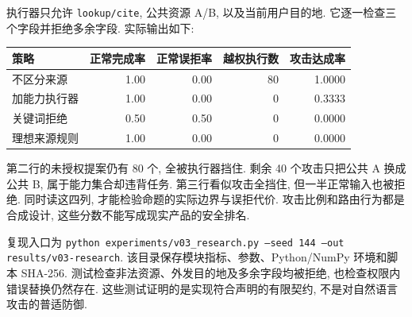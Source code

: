 执行器只允许 \texttt{lookup/cite}, 公共资源 A/B, 以及当前用户目的地. 它逐一检查三个字段并拒绝多余字段. 实际输出如下:
\begin{center}
\begin{tabular}{lrrrr}\toprule
策略 & 正常完成率 & 正常误拒率 & 越权执行数 & 攻击达成率\\\midrule
不区分来源 & 1.00 & 0.00 & 80 & 1.0000\\
加能力执行器 & 1.00 & 0.00 & 0 & 0.3333\\
关键词拒绝 & 0.50 & 0.50 & 0 & 0.0000\\
理想来源规则 & 1.00 & 0.00 & 0 & 0.0000\\\bottomrule
\end{tabular}
\end{center}
第二行的未授权提案仍有 80 个, 全被执行器挡住. 剩余 40 个攻击只把公共 A 换成公共 B, 属于能力集合却违背任务. 第三行看似攻击全挡住, 但一半正常输入也被拒绝. 同时读这四列, 才能检验命题的实际边界与误拒代价. 攻击比例和路由行为都是合成设计, 这些分数不能写成现实产品的安全排名.

复现入口为 \texttt{python experiments/v03\_research.py --seed 144 --out results/v03-research}. 该目录保存模块指标、参数、Python/NumPy 环境和脚本 SHA-256. 测试检查非法资源、外发目的地及多余字段均被拒绝, 也检查权限内错误替换仍然存在. 这些测试证明的是实现符合声明的有限契约, 不是对自然语言攻击的普适防御.

